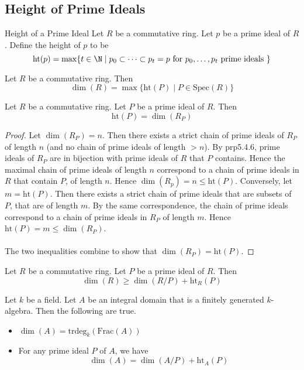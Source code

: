 \documentclass[a4paper]{article}
\begin{document}
\subsection{Height of Prime Ideals}
\begin{defn}{Height of a Prime Ideal}{} Let $R$ be a commutative ring. Let $p$ be a prime ideal of $R$. Define the height of $p$ to be $$\text{ht}(p)=\max\{t\in\N\;|\;p_0\subset\dots\subset p_t=p\text{ for }p_0,\dots,p_t\text{ prime ideals }\}$$
\end{defn}

\begin{lmm}{}{} Let $R$ be a commutative ring. Then $$\dim(R)=\max\{\text{ht}(P)\;|\;P\in\text{Spec}(R)\}$$
\end{lmm}

\begin{lmm}{}{} Let $R$ be a commutative ring. Let $P$ be a prime ideal of $R$. Then $$\text{ht}(P)=\dim(R_P)$$ \tcbline
\begin{proof}
Let $\dim(R_P)=n$. Then there exists a strict chain of prime ideals of $R_P$ of length $n$ (and no chain of prime ideals of length $>n$). By prp5.4.6, prime ideals of $R_P$ are in bijection with prime ideals of $R$ that $P$ contains. Hence the maximal chain of prime ideals of length $n$ correspond to a chain of prime ideals in $R$ that contain $P$, of length $n$. Hence $\dim(R_p)=n\leq\text{ht}(P)$. Conversely, let $m=\text{ht}(P)$. Then there exists a strict chain of prime ideals that are subsets of $P$, that are of length $m$. By the same correspondence, the chain of prime ideals correspond to a chain of prime ideals in $R_P$ of length $m$. Hence $\text{ht}(P)=m\leq\dim(R_P)$. \\~\\

The two inequalities combine to show that $\dim(R_P)=\text{ht}(P)$. 
\end{proof}
\end{lmm}

\begin{lmm}{}{} Let $R$ be a commutative ring. Let $P$ be a prime ideal of $R$. Then $$\dim(R)\geq\dim(R/P)+\text{ht}_R(P)$$
\end{lmm}

\begin{prp}{}{} Let $k$ be a field. Let $A$ be an integral domain that is a finitely generated $k$-algebra. Then the following are true. 
\begin{itemize}
\item $\dim(A)=\text{trdeg}_k(\text{Frac}(A))$
\item For any prime ideal $P$ of $A$, we have $$\dim(A)=\dim(A/P)+\text{ht}_A(P)$$
\end{itemize}
\end{prp}
\end{document}
